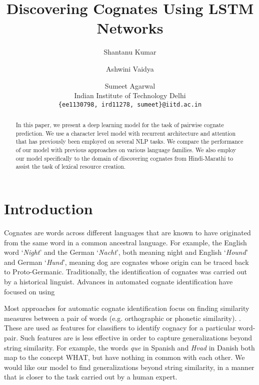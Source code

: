 \documentclass[11pt,letterpaper]{article}
\title{Discovering Cognates Using LSTM Networks}
\author{Shantanu Kumar \and Ashwini Vaidya \and Sumeet Agarwal \\ 
  Indian Institute of Technology Delhi
  \\ {\tt \{ee1130798, ird11278, sumeet\}@iitd.ac.in}}
\date{}
\begin{document}
\maketitle

\begin{abstract}
In this paper, we present a deep learning model for the task of pairwise cognate prediction. We use a character level model with recurrent architecture and attention that has previously been employed on several NLP tasks. We compare the performance of our model with previous approaches on various language families. We also employ our model specifically to the domain of discovering cognates from Hindi-Marathi to assist the task of lexical resource creation.
\end{abstract}

\section{Introduction}
Cognates are words across different languages that are known to have originated from the same word in a common ancestral language. For example, the English word `\textit{Night}' and the German `\textit{Nacht}’, both meaning night and English `\textit{Hound}’ and German `\textit{Hund}’, meaning dog are cognates whose origin can be traced back to Proto-Germanic. Traditionally, the identification of cognates was carried out by a historical linguist. Advances in automated cognate identification have focused on using  

Most approaches for automatic cognate identification focus on finding similarity measures between a pair of words (e.g. orthographic or phonetic similarity). \citep{hauer2011clustering, inkpen2005similarity,List2016g}. These are used as features for classifiers to identify cognacy for a particular word-pair. Such features are is less effective in order to capture generalizations beyond string similarity. For example, the words \textit{que} in Spanish and \textit{Hvad} in Danish both map to the concept \textsc{WHAT}, but have nothing in common with each other. We would like our model to find generalizations beyond string similarity, in a manner that is closer to the task carried out by a human expert. 
\end{document}
